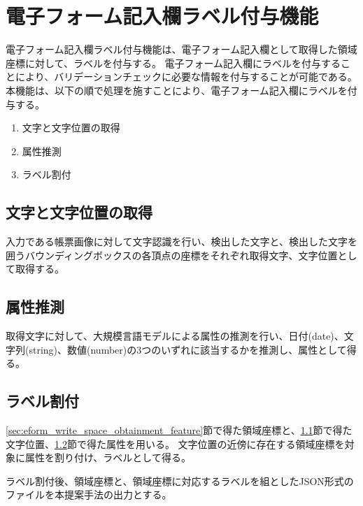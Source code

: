 \section{電子フォーム記入欄ラベル付与機能}\label{sec:label_link}
電子フォーム記入欄ラベル付与機能は、電子フォーム記入欄として取得した領域座標に対して、ラベルを付与する。
電子フォーム記入欄にラベルを付与することにより、バリデーションチェックに必要な情報を付与することが可能である。
本機能は、以下の順で処理を施すことにより、電子フォーム記入欄にラベルを付与する。

\begin{enumerate}
  \item 文字と文字位置の取得
  \item 属性推測
  \item ラベル割付
\end{enumerate}

\subsection{文字と文字位置の取得}\label{subsec:char_and_bbox_obtainment}
入力である帳票画像に対して文字認識を行い、検出した文字と、検出した文字を囲うバウンディングボックスの各頂点の座標をそれぞれ取得文字、文字位置として取得する。

\subsection{属性推測}\label{subsec:att_prediction}
取得文字に対して、大規模言語モデルによる属性の推測を行い、日付(date)、文字列(string)、数値(number)の3つのいずれに該当するかを推測し、属性として得る。

\subsection{ラベル割付}\label{subsec:label_link}
\ref{sec:eform_write_space_obtainment_feature}節で得た領域座標と、\ref{subsec:char_and_bbox_obtainment}節で得た文字位置、\ref{subsec:att_prediction}節で得た属性を用いる。
文字位置の近傍に存在する領域座標を対象に属性を割り付け、ラベルとして得る。

ラベル割付後、領域座標と、領域座標に対応するラベルを組としたJSON形式のファイルを本提案手法の出力とする。
